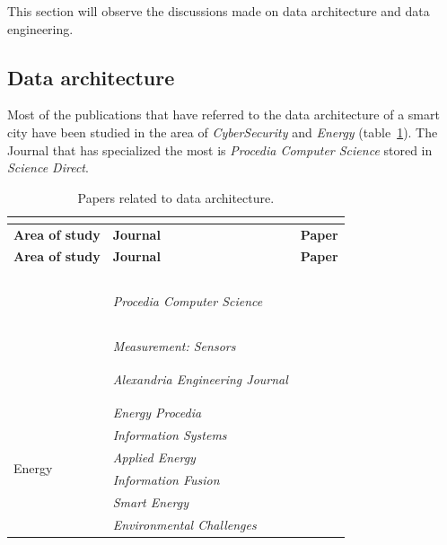 \documentclass[a4paper,12pt,twoside]{ThesisStyle}
\begin{document}
This section will observe the discussions made on data architecture and data engineering.

\subsection{Data architecture}

Most of the publications that have referred to the data architecture of a smart city have been studied in the area of \textit{CyberSecurity} and \textit{Energy} (table~\ref{taula:PDarchitecture}). The Journal that has specialized the most is \textit{Procedia Computer Science} stored in \textit{Science Direct}.

\renewcommand{\arraystretch}{1.5}
\begin{longtable}{  l l l  }
\caption{Papers related to data architecture.}  \\
\label{taula:PDarchitecture}  \\
\hline
  \textbf{Area of study} & \textbf{Journal} & \textbf{Paper} \\
\hline 
\endfirsthead
 \hline
  \textbf{Area of study} & \textbf{Journal} & \textbf{Paper} \\
\hline 
\endhead
\hline
\endfoot
\multirow{6}{*}{CyberSecurity} & \multirow{3}{*}{\textit{Procedia Computer Science}} &  ~\cite{mohamudally2018building} \\
 &  &  ~\cite{bangui2021hybrid} \\
 &  &  ~\cite{bukhari2023anomaly} \\ 
 \cline{2-3} 
 & \textit{Measurement: Sensors} &  ~\cite{abd2022analyze} \\
\cline{2-3} 
  & \multirow{2}{*}{\textit{Alexandria Engineering Journal}} &  ~\cite{saheed2022machine} \\
 &  &  ~\cite{yadav2023augmentation} \\
\hline 
\multirow{6}{*}{Energy}  & \multirow{1}{*}{\textit{Energy Procedia}} &  ~\cite{cerquitelli2017predicting} \\
\cline{2-3} 
& \textit{Information Systems} &  ~\cite{liu2018scalable} \\
\cline{2-3} 
 & \textit{Applied Energy} &  ~\cite{ali2020data} \\
 \cline{2-3} 
&  \textit{Information Fusion} &  ~\cite{himeur2020data} \\
 \cline{2-3} 
 & \textit{Smart Energy} &  ~\cite{leiria2021using} \\
\cline{2-3} 
 & \textit{Environmental Challenges} &  ~\cite{alsalemi2023modular} \\

\end{longtable}
\end{document}
